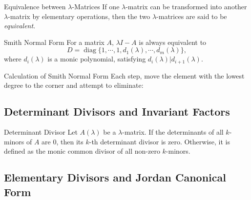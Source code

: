 \begin{definition}{Equivalence between $\lambda$-Matrices}{}
  If one $\lambda$-matrix can be transformed into another $\lambda$-matrix
  by elementary operations, then the two $\lambda$-matrices are said to be
  \emph{equivalent}.
\end{definition}

\begin{theorem}{Smith Normal Form}{}
  For a matrix $A$, $\lambda I - A$ is always equivalent to
  \begin{equation}
    D = \operatorname{diag}\{1, \cdots, 1, d_1(\lambda), \cdots, d_m(\lambda)\},
  \end{equation}
  where $d_i(\lambda)$ is a monic polynomial, satisfying
  $d_i(\lambda)|d_{i+1}(\lambda)$.
\end{theorem}

\begin{proposition}{Calculation of Smith Normal Form}{}
  Each step, move the element with the lowest degree to the corner
  and attempt to eliminate:
\end{proposition}

\subsection{Determinant Divisors and Invariant Factors}

\begin{definition}{Determinant Divisor}{}
  Let $A(\lambda)$ be a $\lambda$-matrix. If the determinants of all $k$-minors
  of $A$ are $0$, then its $k$-th determinant divisor is zero.
  Otherwise, it is defined as the monic common divisor of all non-zero $k$-minors.
\end{definition}


\subsection{Elementary Divisors and Jordan Canonical Form}



